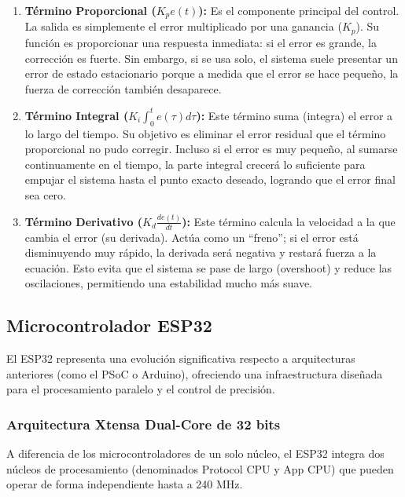 \documentclass[12pt,letterpaper]{report}
\begin{document}
\begin{enumerate}
    \item \textbf{Término Proporcional ($K_p e(t)$):} Es el componente principal del control. La salida es simplemente el error multiplicado por una ganancia ($K_p$). Su función es proporcionar una respuesta inmediata: si el error es grande, la corrección es fuerte. Sin embargo, si se usa solo, el sistema suele presentar un error de estado estacionario porque a medida que el error se hace pequeño, la fuerza de corrección también desaparece.
    
    \item \textbf{Término Integral ($K_i \int_{0}^{t} e(\tau)d\tau$):} Este término suma (integra) el error a lo largo del tiempo. Su objetivo es eliminar el error residual que el término proporcional no pudo corregir. Incluso si el error es muy pequeño, al sumarse continuamente en el tiempo, la parte integral crecerá lo suficiente para empujar el sistema hasta el punto exacto deseado, logrando que el error final sea cero.
    
    \item \textbf{Término Derivativo ($K_d \frac{de(t)}{dt}$):} Este término calcula la velocidad a la que cambia el error (su derivada). Actúa como un ``freno''; si el error está disminuyendo muy rápido, la derivada será negativa y restará fuerza a la ecuación. Esto evita que el sistema se pase de largo (overshoot) y reduce las oscilaciones, permitiendo una estabilidad mucho más suave.
\end{enumerate}

\subsection{Microcontrolador ESP32}

El ESP32 representa una evolución significativa respecto a arquitecturas anteriores (como el PSoC o Arduino), ofreciendo una infraestructura diseñada para el procesamiento paralelo y el control de precisión.

\subsubsection{Arquitectura Xtensa Dual-Core de 32 bits}

A diferencia de los microcontroladores de un solo núcleo, el ESP32 integra dos núcleos de procesamiento (denominados Protocol CPU y App CPU) que pueden operar de forma independiente hasta a 240 MHz.
\end{document}
